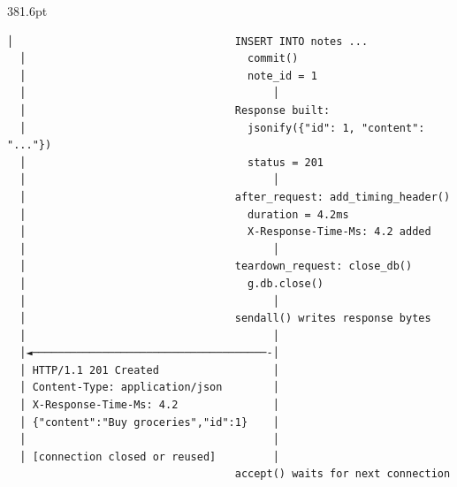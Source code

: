 \begin{diagrambox}{381.6pt}
\begin{Verbatim}[fontsize=\fontsize{9.0}{8.55}\selectfont]
  │                                   INSERT INTO notes ...
  │                                   commit()
  │                                   note_id = 1
  │                                       │
  │                                 Response built:
  │                                   jsonify({"id": 1, "content": "..."})
  │                                   status = 201
  │                                       │
  │                                 after_request: add_timing_header()
  │                                   duration = 4.2ms
  │                                   X-Response-Time-Ms: 4.2 added
  │                                       │
  │                                 teardown_request: close_db()
  │                                   g.db.close()
  │                                       │
  │                                 sendall() writes response bytes
  │                                       │
  │◄─────────────────────────────────────-│
  │ HTTP/1.1 201 Created                  │
  │ Content-Type: application/json        │
  │ X-Response-Time-Ms: 4.2               │
  │ {"content":"Buy groceries","id":1}    │
  │                                       │
  │ [connection closed or reused]         │
                                    accept() waits for next connection
\end{Verbatim}
\end{diagrambox}

